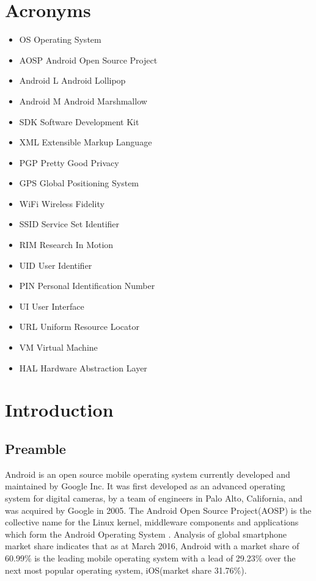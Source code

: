 
\chapter*{Acronyms}
\begin{itemize}
\item[] OS \tab \tab Operating System
\item[] AOSP \tab \tab Android Open Source Project
\item[] Android L \tab Android Lollipop
\item[] Android M \tab Android Marshmallow
\item[] SDK \tab \tab Software Development Kit
\item[] XML \tab \tab Extensible Markup Language
\item[] PGP \tab \tab Pretty Good Privacy
\item[] GPS \tab \tab Global Positioning System
\item[] WiFi \tab \tab Wireless Fidelity
\item[] SSID \tab \tab Service Set Identifier
\item[] RIM \tab \tab Research In Motion
\item[] UID \tab \tab User Identifier
\item[] PIN \tab \tab Personal Identification Number
\item[] UI \tab \tab User Interface
\item[] URL \tab \tab Uniform Resource Locator
\item[] VM \tab \tab Virtual Machine
\item[] HAL \tab \tab Hardware Abstraction Layer
\end{itemize}

\chapter{Introduction} \label{cha:intro}
\section{Preamble}

Android is an open source mobile operating system currently developed and maintained by Google Inc. It was first developed as an advanced operating system for digital cameras, by a team of engineers in Palo Alto, California, and was acquired by Google in 2005. The Android Open Source Project(AOSP) is the collective name for the Linux kernel, middleware components and  applications which form the Android Operating System \cite{a}. Analysis of global smartphone market share indicates that as at March 2016, Android with a market share of 60.99\% is the leading mobile operating system with a lead of 29.23\% over the next most popular operating system, iOS(market share 31.76\%)\cite{b}.
\smallskip

